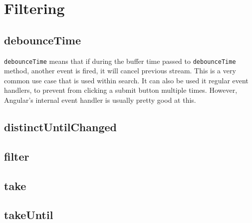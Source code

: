 \chapter{Filtering}

\section{debounceTime}
\lstinline{debounceTime} means that if during the buffer time passed to 
\lstinline{debounceTime} method, another event is fired, it will cancel 
previous stream. This is a very common use case that is used within search.
It can also be used it regular event handlers, to prevent from clicking a 
submit button multiple times. However, Angular's internal event handler 
is usually pretty good at this. 

\section{distinctUntilChanged} 

\section{filter} 

\section{take} 

\section{takeUntil}